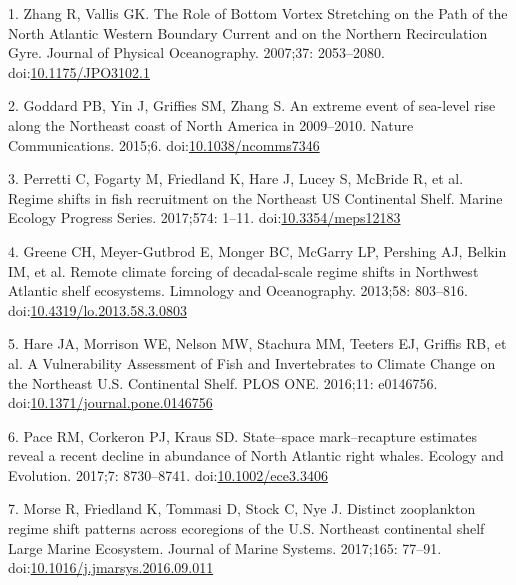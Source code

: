 \documentclass[10pt,]{article}
\begin{document}
\hypertarget{refs}{}
\hypertarget{ref-zhang_role_2007}{}
1. Zhang R, Vallis GK. The Role of Bottom Vortex Stretching on the Path
of the North Atlantic Western Boundary Current and on the Northern
Recirculation Gyre. Journal of Physical Oceanography. 2007;37:
2053--2080.
doi:\href{https://doi.org/10.1175/JPO3102.1}{10.1175/JPO3102.1}

\hypertarget{ref-goddard_extreme_2015}{}
2. Goddard PB, Yin J, Griffies SM, Zhang S. An extreme event of
sea-level rise along the Northeast coast of North America in 2009--2010.
Nature Communications. 2015;6.
doi:\href{https://doi.org/10.1038/ncomms7346}{10.1038/ncomms7346}

\hypertarget{ref-perretti_regime_2017}{}
3. Perretti C, Fogarty M, Friedland K, Hare J, Lucey S, McBride R, et
al. Regime shifts in fish recruitment on the Northeast US Continental
Shelf. Marine Ecology Progress Series. 2017;574: 1--11.
doi:\href{https://doi.org/10.3354/meps12183}{10.3354/meps12183}

\hypertarget{ref-greene_remote_2013}{}
4. Greene CH, Meyer-Gutbrod E, Monger BC, McGarry LP, Pershing AJ,
Belkin IM, et al. Remote climate forcing of decadal-scale regime shifts
in Northwest Atlantic shelf ecosystems. Limnology and Oceanography.
2013;58: 803--816.
doi:\href{https://doi.org/10.4319/lo.2013.58.3.0803}{10.4319/lo.2013.58.3.0803}

\hypertarget{ref-hare_vulnerability_2016}{}
5. Hare JA, Morrison WE, Nelson MW, Stachura MM, Teeters EJ, Griffis RB,
et al. A Vulnerability Assessment of Fish and Invertebrates to Climate
Change on the Northeast U.S. Continental Shelf. PLOS ONE. 2016;11:
e0146756.
doi:\href{https://doi.org/10.1371/journal.pone.0146756}{10.1371/journal.pone.0146756}

\hypertarget{ref-pace_statespace_2017}{}
6. Pace RM, Corkeron PJ, Kraus SD. State--space mark--recapture
estimates reveal a recent decline in abundance of North Atlantic right
whales. Ecology and Evolution. 2017;7: 8730--8741.
doi:\href{https://doi.org/10.1002/ece3.3406}{10.1002/ece3.3406}

\hypertarget{ref-morse_distinct_2017}{}
7. Morse R, Friedland K, Tommasi D, Stock C, Nye J. Distinct zooplankton
regime shift patterns across ecoregions of the U.S. Northeast
continental shelf Large Marine Ecosystem. Journal of Marine Systems.
2017;165: 77--91.
doi:\href{https://doi.org/10.1016/j.jmarsys.2016.09.011}{10.1016/j.jmarsys.2016.09.011}
\end{document}
